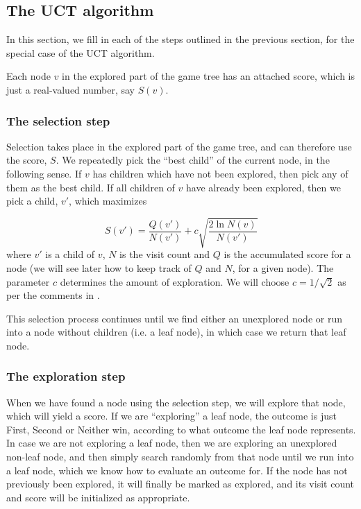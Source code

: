 \subsection{The UCT algorithm}
\label{sec:uct}

In this section, we fill in each of the steps outlined in the previous section, for the special case of the UCT algorithm.

Each node $v$ in the explored part of the game tree has an attached score, which is just a real-valued number, say $S(v)$.

\subsubsection{The selection step}
\label{subsec:uct_selection_step}

Selection takes place in the explored part of the game tree, and can therefore use the score, $S$.
We repeatedly pick the ``best child'' of the current node, in the following sense.
If $v$ has children which have not been explored, then pick any of them as the best child.
If all children of $v$ have already been explored, then we pick a child, $v'$, which maximizes

\begin{equation}
\label{eq:uctnodevalue}
S(v') = \frac{Q(v')}{N(v')} + c\sqrt{\frac{2\ln{N(v)}}{N(v')}}
\end{equation} 
where $v'$ is a child of $v$, $N$ is the visit count and $Q$ is the accumulated score for a node (we will see later how to keep track of $Q$ and $N$, for a given node).
The parameter $c$ determines the amount of exploration. We will choose $c = 1 / \sqrt 2$ as per the comments in \citep[p. 9]{mcts_survey12}.

This selection process continues until we find either an unexplored node or run into a node without children (i.e. a leaf node), in which case we return that leaf node.

\subsubsection{The exploration step}
\label{sec:exploration_step_explanation}

When we have found a node using the selection step, we will explore that node, which will yield a score.
If we are ``exploring'' a leaf node, the outcome is just First, Second or Neither win, according to what outcome the leaf node represents.
In case we are not exploring a leaf node, then we are exploring an unexplored non-leaf node, and then simply search randomly from that node until we run into a leaf node, which we know how to evaluate an outcome for.
If the node has not previously been explored, it will finally be marked as explored, and its visit count and score will be initialized as appropriate.

